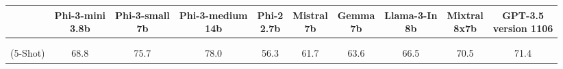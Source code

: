 \documentclass[11pt]{article}
\newcommand{\datasetcell}[3]{\makecell{ \large #1  \\  \tiny (#2) \tiny #3   }  }
\begin{document}

\begin{center}
\begin{adjustbox}{width=0.95\textwidth,center}
\begin{tabular}{ c||ccccccccc } 
\label{tbl:benchmarks}
&\makecell{Phi-3-mini\\ \footnotesize 3.8b } & \makecell{Phi-3-small\\ \footnotesize 7b } &  \makecell{Phi-3-medium\\ \footnotesize 14b } & \makecell{Phi-2 \\ \footnotesize 2.7b } & \makecell{Mistral\\ \footnotesize 7b } &\makecell{Gemma \\ \footnotesize 7b }&\makecell{Llama-3-In \\ \footnotesize 8b }  & \makecell{Mixtral\\ \footnotesize 8x7b }   &  \makecell{GPT-3.5 \\ \footnotesize version 1106}  \\
\hline & \\[-1.5ex]

\datasetcell{MMLU}{5-Shot}{\cite{hendrycks2021measuring} }         & 68.8 & 75.7 & 78.0 & 56.3 & 61.7& 63.6  & 66.5 & 70.5  & 71.4  \\ 



\end{tabular}
\end{adjustbox}
\end{center}
\end{document}
